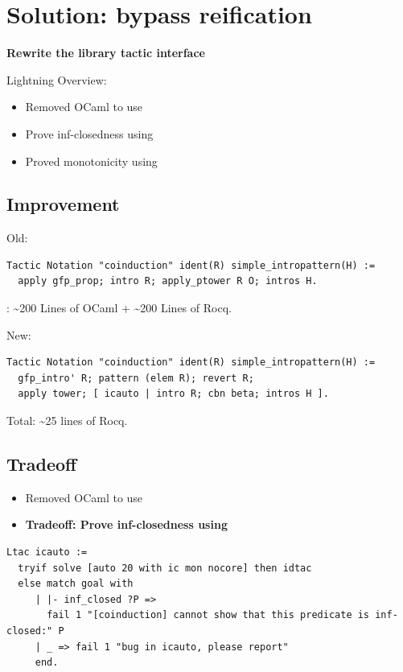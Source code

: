 \section{Solution: bypass reification}
\label{sec:rewrite}

\textbf{Rewrite the  library tactic interface}

Lightning Overview:
\begin{itemize}
  \item[$\rightarrow$] Removed OCaml to use 
  \item[$\rightarrow$] Prove inf-closedness using 
  \item[$\rightarrow$] Proved monotonicity using 
\end{itemize}

\subsection{Improvement}

Old:
\begin{lstlisting}
Tactic Notation "coinduction" ident(R) simple_intropattern(H) :=
  apply gfp_prop; intro R; apply_ptower R O; intros H.
\end{lstlisting}

: \textasciitilde200 Lines of OCaml + \textasciitilde200
Lines of Rocq.

New:
\begin{lstlisting}
Tactic Notation "coinduction" ident(R) simple_intropattern(H) :=
  gfp_intro' R; pattern (elem R); revert R;
  apply tower; [ icauto | intro R; cbn beta; intros H ].
\end{lstlisting}

Total: \textasciitilde25 lines of Rocq.

\subsection{Tradeoff}

\begin{itemize}
  \item[$\rightarrow$] Removed OCaml to use 
  \item[$\rightarrow$] \textbf{Tradeoff: Prove inf-closedness using }
\end{itemize}

\begin{lstlisting}
Ltac icauto :=
  tryif solve [auto 20 with ic mon nocore] then idtac
  else match goal with
     | |- inf_closed ?P =>
       fail 1 "[coinduction] cannot show that this predicate is inf-closed:" P
     | _ => fail 1 "bug in icauto, please report"
     end.
\end{lstlisting}

